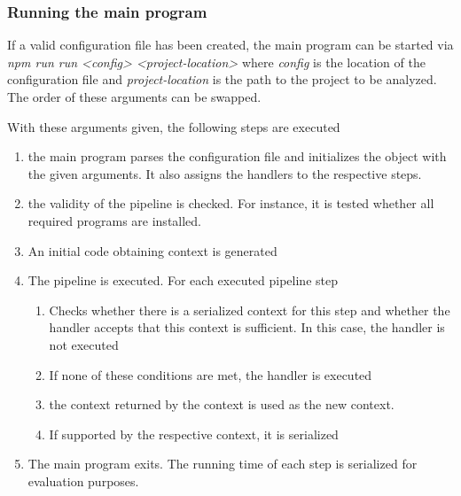 \subsubsection{Running the main program}


If a valid configuration file has been created, the main program can be started via \textit{npm run run <config> <project-location>} where \textit{config} is the location of the configuration file and \textit{project-location} is the path to the project to be analyzed. The order of these arguments can be swapped. 

With these arguments given, the following steps are executed

\begin{enumerate}
    \item the main program parses the configuration file and initializes the object with the given arguments. It also assigns the handlers to the respective steps.
    \item  the validity of the pipeline is checked. For instance, it is tested whether all required programs are installed.
    \item An initial code obtaining context is generated
    \item The pipeline is executed. For each executed pipeline step
    \begin{enumerate}
        \item Checks whether there is a serialized context for this step and whether the handler accepts that this context is sufficient. In this case, the handler is not executed
        \item If none of these conditions are met, the handler is executed
        \item the context returned by the context is used as the new context.
        \item If supported by the respective context, it is serialized
    \end{enumerate}
    \item The main program exits. The running time of each step is serialized for evaluation purposes. 
\end{enumerate}